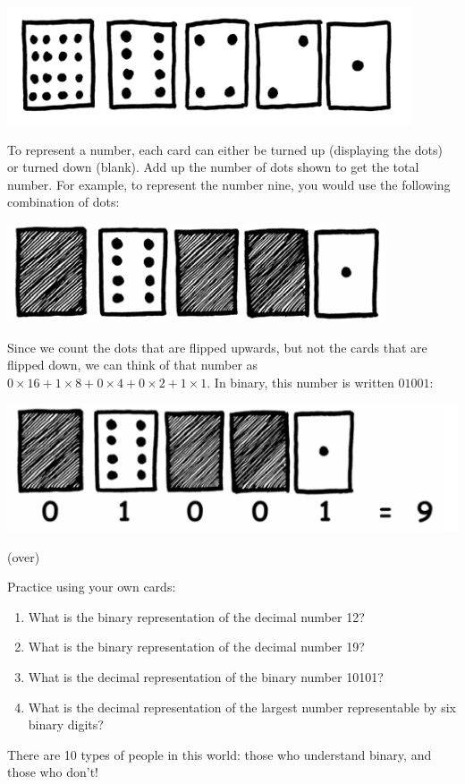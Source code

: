 \documentclass{article}
\begin{document}
\begin{minipage}{\textwidth}
\centering
\includegraphics[width=.7\textwidth]{dots}
\end{minipage}
To represent a number, each card can either be turned up (displaying the dots)
or turned down (blank). Add up the number of dots shown to get the total number.
For example, to represent the number nine, you would use the following
combination of dots:

\begin{minipage}{\textwidth}
\centering
\includegraphics[width=.7\textwidth]{dots9}
\end{minipage}
Since we count the dots that are flipped upwards, but not the cards that are
flipped down, we can think of that number as
$0\times16 + 1\times8 + 0\times4 + 0\times2 + 1\times1$. In binary, this number
is written $01001$:

\begin{minipage}{\textwidth}
\centering
\includegraphics[width=.7\textwidth]{dots9'}
\end{minipage}
 
\vfill
\begin{center}(over)
\end{center}
\newpage

\noindent
Practice using your own cards:
\begin{enumerate}
    \item What is the binary representation of the decimal number 12? %
    \item What is the binary representation of the decimal number 19? %
    \item What is the decimal representation of the binary number 10101? %
    \item What is the decimal representation of the largest number representable
      by six binary digits? %
\end{enumerate}
There are 10 types of people in this world: those who understand binary, and
those who don't!
\end{document}
